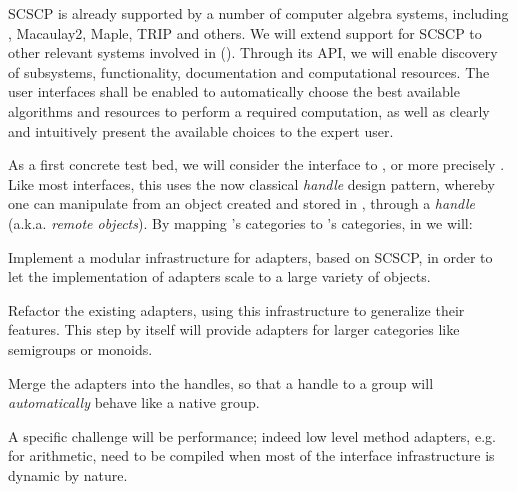 \begin{workpackage}[id=component-architecture,wphases=0-48!.5,
  title=Component Architecture,lead=UV,
  PSRM=24,UVRM=8,SARM=16, USHRM=4, USORM=6]
\begin{tasklist}
\begin{task}[title=Interfaces between systems,id=interface-systems,lead=PS,PM=18]
    SCSCP is already supported by a number of computer algebra
    systems, including \GAP, Macaulay2, Maple, TRIP and others. We
    will extend support for SCSCP to other relevant systems involved
    in \TheProject ().
    Through its API, we will enable discovery of subsystems,
    functionality, documentation and computational resources. The user
    interfaces shall be enabled to automatically choose the best
    available algorithms and resources to perform a required
    computation, as well as clearly and intuitively present the
    available choices to the expert user.

    As a first concrete test bed, we will consider the \Sage interface
    to \GAP, or more precisely \libGAP.  Like most \Sage interfaces,
    this uses the now classical \emph{handle} design pattern, whereby
    one can manipulate from \Sage an object created and stored in
    \GAP, through a \emph{handle} (a.k.a. \emph{remote objects}).  By
    mapping \GAP's categories to \Sage's categories, in
     we
    will:
    \begin{compactitem}
    \item Implement a modular infrastructure for adapters, based on
      SCSCP, in order to let the implementation of adapters scale to a
      large variety of objects.
    \item Refactor the existing adapters, using this infrastructure to
      generalize their features. This step by itself will provide
      adapters for larger categories like semigroups or monoids.
    \item Merge the adapters into the handles, so that a handle to a
      \GAP group will \emph{automatically} behave like a native \Sage
      group.
    \end{compactitem}
    A specific challenge will be performance; indeed low level method
    adapters, e.g. for arithmetic, need to be compiled when most of
    the interface infrastructure is dynamic by nature.


  \end{task}


\end{tasklist}
\end{workpackage}

